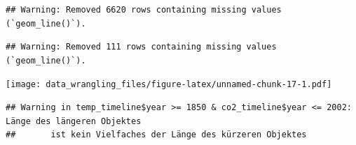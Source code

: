 \documentclass[
]{article}
\newenvironment{Shaded}{\begin{snugshade}}{\end{snugshade}}
\newcommand{\CommentTok}[1]{\textcolor[rgb]{0.56,0.35,0.01}{\textit{#1}}}
\newcommand{\DecValTok}[1]{\textcolor[rgb]{0.00,0.00,0.81}{#1}}
\newcommand{\NormalTok}[1]{#1}
\newcommand{\OtherTok}[1]{\textcolor[rgb]{0.56,0.35,0.01}{#1}}
\newcommand{\SpecialCharTok}[1]{\textcolor[rgb]{0.81,0.36,0.00}{\textbf{#1}}}
\begin{document}
\begin{verbatim}
## Warning: Removed 6620 rows containing missing values (`geom_line()`).
\end{verbatim}

\begin{verbatim}
## Warning: Removed 111 rows containing missing values (`geom_line()`).
\end{verbatim}

\texttt{[image: data\_wrangling\_files/figure-latex/unnamed-chunk-17-1.pdf]}

\begin{Shaded}
\end{Shaded}

\begin{verbatim}
## Warning in temp_timeline$year >= 1850 & co2_timeline$year <= 2002: Länge des längeren Objektes
##       ist kein Vielfaches der Länge des kürzeren Objektes
\end{verbatim}
\end{document}
